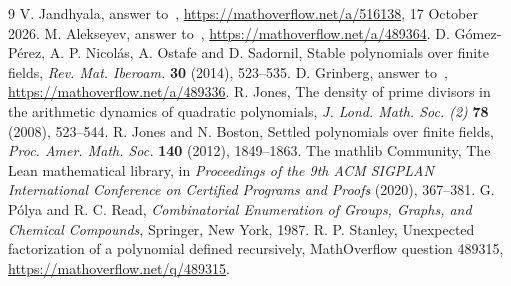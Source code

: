 \documentclass[11pt]{article}
\theoremstyle{remark}
\begin{document}
\begin{thebibliography}{9}
 V. Jandhyala, answer to~\cite{MO}, \url{https://mathoverflow.net/a/516138}, 17 October 2026.
 M. Alekseyev, answer to~\cite{MO}, \url{https://mathoverflow.net/a/489364}.
 D. G\'omez-P\'erez, A. P. Nicol\'as, A. Ostafe and D. Sadornil, Stable polynomials over finite fields, \emph{Rev. Mat. Iberoam.} \textbf{30} (2014), 523--535.
 D. Grinberg, answer to~\cite{MO}, \url{https://mathoverflow.net/a/489336}.
 R. Jones, The density of prime divisors in the arithmetic dynamics of quadratic polynomials, \emph{J. Lond. Math. Soc. (2)} \textbf{78} (2008), 523--544.
 R. Jones and N. Boston, Settled polynomials over finite fields, \emph{Proc. Amer. Math. Soc.} \textbf{140} (2012), 1849--1863.
 The mathlib Community, The Lean mathematical library, in \emph{Proceedings of the 9th ACM SIGPLAN International Conference on Certified Programs and Proofs} (2020), 367--381.
 G. P\'olya and R. C. Read, \emph{Combinatorial Enumeration of Groups, Graphs, and Chemical Compounds}, Springer, New York, 1987.
 R. P. Stanley, Unexpected factorization of a polynomial defined recursively, MathOverflow question 489315, \url{https://mathoverflow.net/q/489315}.
\end{thebibliography}
\end{document}
